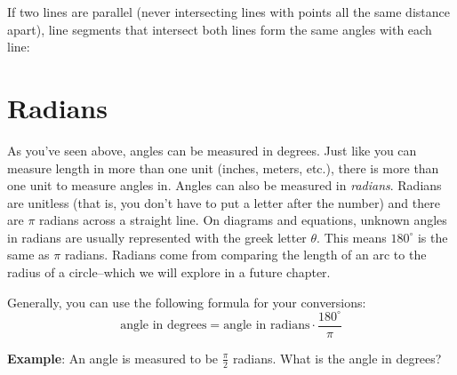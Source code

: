 If two lines are parallel (never intersecting lines with points all the same distance apart), line segments that intersect both lines form the 
same angles with each line:
\begin{center}
\end{center}


\section{Radians}
As you've seen above, angles can be measured in degrees. Just like you can 
measure length in more than one unit (inches, meters, etc.), there is more 
than one unit to measure angles in. Angles can also be measured in \textit{
radians}. Radians are unitless (that is, you don't have to put 
a letter after the number) and there are $\pi$ radians across a straight line. 
On diagrams and equations, unknown angles in radians are usually represented with the greek letter $\theta$.
This means $180^\circ$ is the same as $\pi$ radians. 
Radians come from comparing the length of an arc to the radius of a circle--which we will explore in a future chapter.

Generally, you can use the following formula for your conversions:
$${\displaystyle {\text{angle in degrees}}={\text{angle in radians}}\cdot {\frac {180^{\circ }}{\pi }}}$$

\textbf{Example}: An angle is measured to be $\frac{\pi}{2}$ radians. What is 
the angle in degrees?

